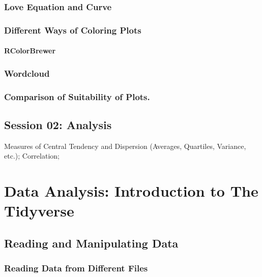 \documentclass[
]{book}
\begin{document}
\hypertarget{love-equation-and-curve}{%
\subsection{Love Equation and Curve}\label{love-equation-and-curve}}

\hypertarget{different-ways-of-coloring-plots}{%
\subsection{Different Ways of Coloring Plots}\label{different-ways-of-coloring-plots}}

\hypertarget{rcolorbrewer}{%
\subsubsection{RColorBrewer}\label{rcolorbrewer}}

\hypertarget{wordcloud}{%
\subsection{Wordcloud}\label{wordcloud}}

\hypertarget{comparison-of-suitability-of-plots.}{%
\subsection{Comparison of Suitability of Plots.}\label{comparison-of-suitability-of-plots.}}

\hypertarget{session-02-analysis}{%
\section{Session 02: Analysis}\label{session-02-analysis}}

Measures of Central Tendency and Dispersion (Averages, Quartiles, Variance, etc.); Correlation;

\hypertarget{tidy-1}{%
\chapter{Data Analysis: Introduction to The Tidyverse}\label{tidy-1}}

\hypertarget{reading-and-manipulating-data}{%
\section{Reading and Manipulating Data}\label{reading-and-manipulating-data}}

\hypertarget{reading-data-from-different-files}{%
\subsection{Reading Data from Different Files}\label{reading-data-from-different-files}}
\end{document}
